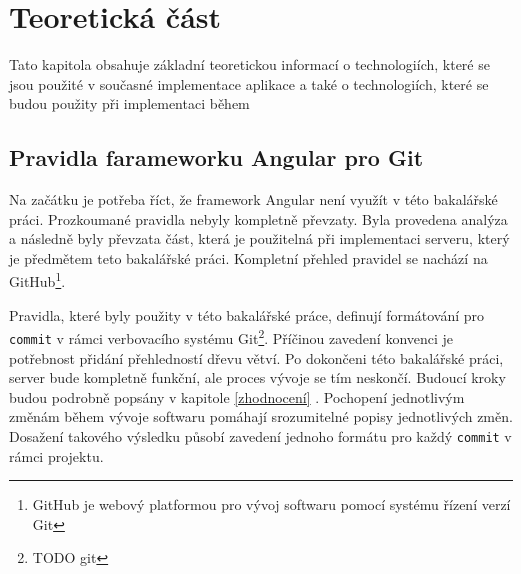\chapter{Teoretická část}\label{resere}
Tato kapitola obsahuje základní teoretickou informací o technologiích, které se jsou použité v současné implementace aplikace a také o technologiích, které se budou použity při implementaci během 

\section{Pravidla farameworku Angular pro Git}\label{reserse:git}
    Na začátku je potřeba říct, že framework Angular není využít v této bakalářské práci. Prozkoumané pravidla nebyly kompletně převzaty. Byla provedena analýza a následně byly převzata část, která
    je použitelná při implementaci serveru, který je předmětem teto bakalářské práci. Kompletní přehled pravidel se nachází na GitHub\footnote{ GitHub je webový platformou pro vývoj softwaru pomocí systému řízení verzí Git}\cite{angular-git}.
    
    Pravidla, které byly použity v této bakalářské práce, definují formátování pro \verb|commit| v rámci verbovacího systému Git\footnote{TODO git}. Příčinou zavedení konvenci je potřebnost přidání přehledností dřevu větví. Po dokončeni této bakalářské práci, server bude kompletně funkční, ale proces vývoje se tím neskončí. Budoucí kroky budou podrobně popsány v kapitole \ref{zhodnocení} . Pochopení jednotlivým změnám během vývoje softwaru pomáhají srozumitelné popisy jednotlivých změn. Dosažení takového výsledku působí zavedení jednoho formátu pro každý \verb|commit| v rámci projektu.
    
